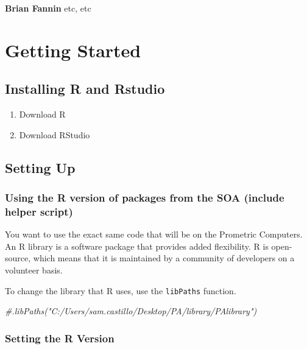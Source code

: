 \documentclass[]{book}
\newenvironment{Shaded}{\begin{snugshade}}{\end{snugshade}}
\newcommand{\CommentTok}[1]{\textcolor[rgb]{0.56,0.35,0.01}{\textit{#1}}}
\providecommand{\tightlist}{%
  \setlength{\itemsep}{0pt}\setlength{\parskip}{0pt}}
\begin{document}
\textbf{Brian Fannin} etc, etc

\hypertarget{intro}{%
\chapter{Getting Started}\label{intro}}

\hypertarget{installing-r-and-rstudio}{%
\section{Installing R and Rstudio}\label{installing-r-and-rstudio}}

\begin{enumerate}
\def\labelenumi{\arabic{enumi}.}
\tightlist
\item
  Download R
\item
  Download RStudio
\end{enumerate}

\hypertarget{setting-up}{%
\section{Setting Up}\label{setting-up}}

\hypertarget{using-the-r-version-of-packages-from-the-soa-include-helper-script}{%
\subsection{Using the R version of packages from the SOA (include helper script)}\label{using-the-r-version-of-packages-from-the-soa-include-helper-script}}

You want to use the exact same code that will be on the Prometric Computers. An R library is a software package that provides added flexibility. R is open-source, which means that it is maintained by a community of developers on a volunteer basis.

To change the library that R uses, use the \texttt{libPaths} function.

\begin{Shaded}
\begin{Highlighting}[]
\CommentTok{#.libPaths("C:/Users/sam.castillo/Desktop/PA/library/PAlibrary")}
\end{Highlighting}
\end{Shaded}

\hypertarget{setting-the-r-version}{%
\subsection{Setting the R Version}\label{setting-the-r-version}}
\end{document}
